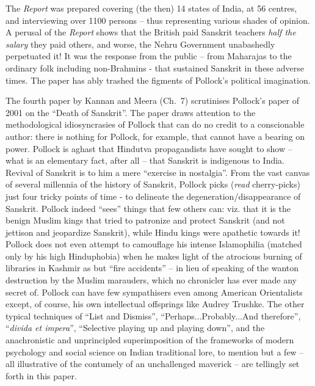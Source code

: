 The {\sl Report} was prepared covering (the then) 14 states of India, at 56 centres, and interviewing over 1100 persons – thus representing various shades of opinion. A perusal of the {\sl Report} shows that the British paid Sanskrit teachers {\sl half the salary} they paid others, and worse, the Nehru Government unabashedly perpetuated it! It was the response from the public – from Maharajas to the ordinary folk including non-Brahmins - that sustained Sanskrit in these adverse times. The paper has ably trashed the figments of Pollock’s political imagination.


The fourth paper by Kannan and Meera (Ch.~7) scrutinises Pollock’s paper of 2001 on the “Death of Sanskrit”. The paper draws attention to the methodological idiosyncrasies of Pollock that can do no credit to a conscionable author: there is nothing for Pollock, for example, that cannot have a bearing on power. Pollock is aghast that Hindutva propagandists have sought to show – what is an elementary fact, after all – that Sanskrit is indigenous to India.  Revival of Sanskrit is to him a mere “exercise in nostalgia”. From the vast canvas of several millennia of the history of Sanskrit, Pollock picks ({\sl read} cherry-picks) just four tricky points of time - to delineate the degeneration/disappearance of Sanskrit. Pollock indeed “sees” things that few others can: viz. that it is the benign Muslim kings that tried to patronize and protect Sanskrit (and not jettison and jeopardize Sanskrit), while Hindu kings were apathetic towards it! Pollock does not even attempt to camouflage his intense Islamophilia (matched only by his high Hinduphobia) when he makes light of the atrocious burning of libraries in Kashmir as but “fire accidents” – in lieu of speaking of the wanton destruction by the Muslim marauders, which no chronicler has ever made any secret of. Pollock can have few sympathisers even among American Orientalists except, of course, his own intellectual offsprings like Audrey Trushke. The other typical techniques of “List and Dismiss”, “Perhaps...Probably...And therefore”, “{\sl divida et impera}”, “Selective playing up and playing down”, and the anachronistic and unprincipled superimposition of the frameworks of modern psychology and social science on Indian traditional lore, to mention but a few – all illustrative of the contumely of an unchallenged maverick – are tellingly set forth in this paper.


